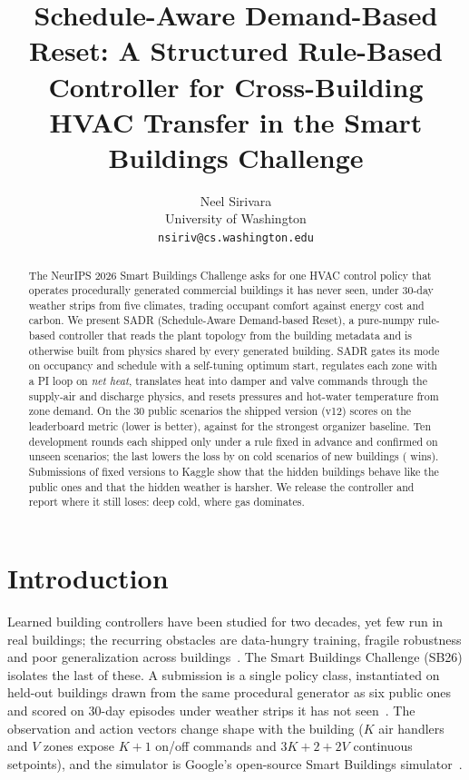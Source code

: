 \documentclass{article}
\title{Schedule-Aware Demand-Based Reset: A Structured Rule-Based Controller for Cross-Building HVAC Transfer in the Smart Buildings Challenge}
\author{%
  Neel Sirivara\\
  University of Washington\\
  \texttt{nsiriv@cs.washington.edu}
}
\begin{document}
\maketitle

\begin{abstract}
The NeurIPS 2026 Smart Buildings Challenge asks for one HVAC control policy that operates procedurally generated commercial buildings it has never seen, under 30-day weather strips from five climates, trading occupant comfort against energy cost and carbon. We present SADR (Schedule-Aware Demand-based Reset), a pure-numpy rule-based controller that reads the plant topology from the building metadata and is otherwise built from physics shared by every generated building. SADR gates its mode on occupancy and schedule with a self-tuning optimum start, regulates each zone with a PI loop on \emph{net heat}, translates heat into damper and valve commands through the supply-air and discharge physics, and resets pressures and hot-water temperature from zone demand. On the 30 public scenarios the shipped version (v12) scores \RTenConfPubCand{} on the leaderboard metric (lower is better), against \MetricPidWater{} for the strongest organizer baseline. Ten development rounds each shipped only under a rule fixed in advance and confirmed on unseen scenarios; the last lowers the loss by \RTenConfHarshCThreeRelAbs{} on \RTenConfHarshCThreeN{} cold scenarios of \RTenNNewBuild{} new buildings (\RTenConfHarshCThreeWins{} wins). Submissions of fixed versions to Kaggle show that the hidden buildings behave like the public ones and that the hidden weather is harsher. We release the controller and report where it still loses: deep cold, where gas dominates.
\end{abstract}

\section{Introduction}

Learned building controllers have been studied for two decades, yet few run in real buildings; the recurring obstacles are data-hungry training, fragile robustness and poor generalization across buildings~\citep{wang2020rl}. The Smart Buildings Challenge (SB26) isolates the last of these. A submission is a single policy class, instantiated on held-out buildings drawn from the same procedural generator as six public ones and scored on 30-day episodes under weather strips it has not seen~\citep{sb26kit}. The observation and action vectors change shape with the building ($K$ air handlers and $V$ zones expose $K{+}1$ on/off commands and $3K{+}2{+}2V$ continuous setpoints), and the simulator is Google's open-source Smart Buildings simulator~\citep{goldfeder2023lightweight,goldfeder2025suite}.
\end{document}
